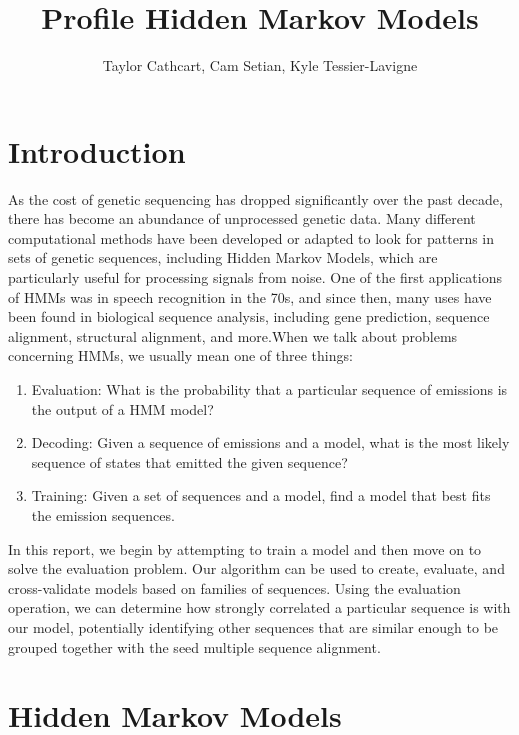\documentclass{article}
\title{Profile Hidden Markov Models}
\author{Taylor Cathcart, Cam Setian, Kyle Tessier-Lavigne}
\begin{document}
\maketitle

\section{Introduction}

As the cost of genetic sequencing has dropped significantly over the past decade, there has become an abundance of unprocessed genetic data. Many different computational methods have been developed or adapted to look for patterns in sets of genetic sequences, including Hidden Markov Models, which are particularly useful for processing signals from noise. One of the first applications of HMMs was in speech recognition in the 70s, and since then, many uses have been found in biological sequence analysis, including gene prediction, sequence alignment, structural alignment, and more.\footnotemark[1] When we talk about problems concerning HMMs, we usually mean one of three things:
\begin{enumerate}
\item Evaluation: What is the probability that a particular sequence of emissions is the output of a HMM model?
\item Decoding: Given a sequence of emissions and a model, what is the most likely sequence of states that emitted the given sequence?
\item Training: Given a set of sequences and a model, find a model that best fits the emission sequences.
\end{enumerate}
In this report, we begin by attempting to train a model and then move on to solve the evaluation problem. Our algorithm can be used to create, evaluate, and cross-validate models based on families of sequences. Using the evaluation operation, we can determine how strongly correlated a particular sequence is with our model, potentially identifying other sequences that are similar enough to be grouped together with the seed multiple sequence alignment.


\section{Hidden Markov Models}
\end{document}
